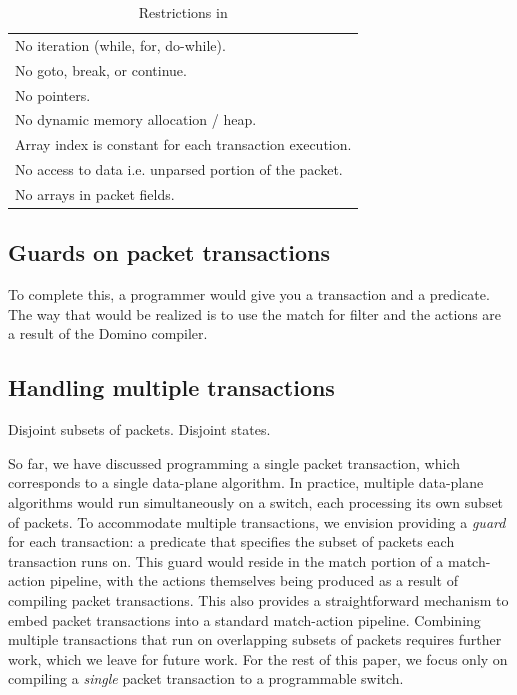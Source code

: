 \begin{table}
  \begin{tabular}{p{}}
    No iteration (while, for, do-while).\\
    No goto, break, or continue.\\
    No pointers.\\
    No dynamic memory allocation / heap.\\
    Array index is constant for each transaction execution.\\
    No access to data i.e. unparsed portion of the packet.\\
    No arrays in packet fields.\\
  \end{tabular}
  \caption{Restrictions in \pktlanguage}
  \label{tab:restrict}
\end{table}

\subsection{Guards on packet transactions}
\label{ss:guard}
To complete this, a programmer would give you a transaction and a predicate.
The way that would be realized is to use the match for filter and the actions
are a result of the Domino compiler.

\subsection{Handling multiple transactions}
\label{ss:multiple}
Disjoint subsets of packets. Disjoint states.

So far, we have discussed programming a single packet transaction, which
corresponds to a single data-plane algorithm. In practice, multiple data-plane
algorithms would run simultaneously on a switch, each processing its own subset
of packets. To accommodate multiple transactions, we envision providing a
\textit{guard} for each transaction: a predicate that specifies the subset of
packets each transaction runs on. This guard would reside in the match portion
of a match-action pipeline, with the actions themselves being produced as a
result of compiling packet transactions. This also provides a straightforward
mechanism to embed packet transactions into a standard match-action pipeline.
Combining multiple transactions that run on overlapping subsets of packets
requires further work, which we leave for future work. For the rest of this
paper, we focus only on compiling a \textit{single} packet transaction to a
programmable switch.

